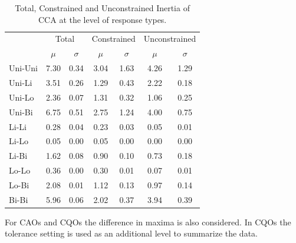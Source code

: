 		\begin{table}[h!]
			
			\small
			\centering
			\caption{Total, Constrained and Unconstrained Inertia of CCA at the level of response types.}
			
			
			\begin{tabular}{@{}lcccccc@{}}
				
			
				\toprule
				& \multicolumn{2}{c}{Total} & \multicolumn{2}{c}{Constrained} & \multicolumn{2}{c}{Unconstrained}\\\cmidrule(l){2-3} \cmidrule(l){4-5} \cmidrule(l){6-7}
				& $\mu$ & $\sigma$ & $\mu$ & $\sigma$ & $\mu$ & $\sigma$\\
				\hline
				Uni-Uni & 7.30 & 0.34 & 3.04 & 1.63 & 4.26   & 1.29 \\
				Uni-Li  & 3.51 & 0.26 & 1.29 & 0.43 & 2.22   & 0.18 \\
				Uni-Lo  & 2.36 & 0.07 & 1.31 & 0.32 & 1.06   & 0.25 \\
				Uni-Bi  & 6.75 & 0.51 & 2.75 & 1.24 & 4.00   & 0.75 \\
				Li-Li   & 0.28 & 0.04 & 0.23 & 0.03 & 0.05   & 0.01 \\
				Li-Lo   & 0.05 & 0.00 & 0.05 & 0.00 & 0.00   & 0.00 \\
				Li-Bi   & 1.62 & 0.08 & 0.90 & 0.10 & 0.73   & 0.18 \\
				Lo-Lo   & 0.36 & 0.00 & 0.30 & 0.01 & 0.07   & 0.01 \\
				Lo-Bi   & 2.08 & 0.01 & 1.12 & 0.13 & 0.97   & 0.14 \\
				Bi-Bi   & 5.96 & 0.06 & 2.02 & 0.37 & 3.94   & 0.39	\\
				
				\toprule
				
			\end{tabular}
			
			\label{tab:smcca6}
		
		\end{table}
		
		\vspace{10em}
		
		
	For CAOs and CQOs the difference in maxima is also considered. 
	In CQOs the tolerance setting is used as an additional level to summarize the data. 
			

